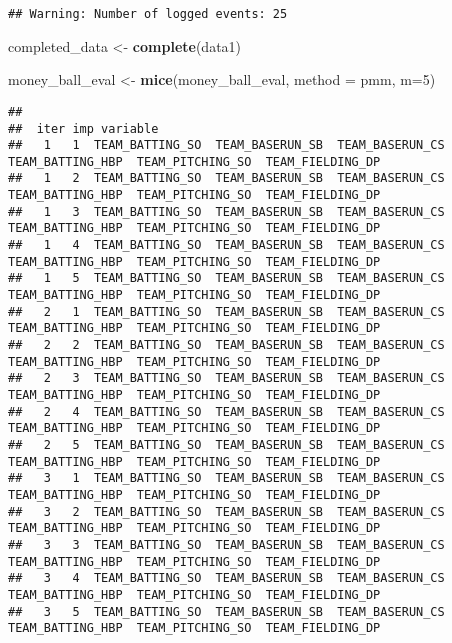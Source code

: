 \documentclass[
]{article}
\newenvironment{Shaded}{\begin{snugshade}}{\end{snugshade}}
\newcommand{\AttributeTok}[1]{\textcolor[rgb]{0.13,0.29,0.53}{#1}}
\newcommand{\DecValTok}[1]{\textcolor[rgb]{0.00,0.00,0.81}{#1}}
\newcommand{\FunctionTok}[1]{\textcolor[rgb]{0.13,0.29,0.53}{\textbf{#1}}}
\newcommand{\NormalTok}[1]{#1}
\newcommand{\OtherTok}[1]{\textcolor[rgb]{0.56,0.35,0.01}{#1}}
\newcommand{\StringTok}[1]{\textcolor[rgb]{0.31,0.60,0.02}{#1}}
\begin{document}
\begin{verbatim}
## Warning: Number of logged events: 25
\end{verbatim}

\begin{Shaded}
\begin{Highlighting}[]
\NormalTok{completed\_data }\OtherTok{\textless{}{-}} \FunctionTok{complete}\NormalTok{(data1)}

\NormalTok{money\_ball\_eval }\OtherTok{\textless{}{-}} \FunctionTok{mice}\NormalTok{(money\_ball\_eval, }\AttributeTok{method =} \StringTok{\textquotesingle{}pmm\textquotesingle{}}\NormalTok{, }\AttributeTok{m=}\DecValTok{5}\NormalTok{)}
\end{Highlighting}
\end{Shaded}

\begin{verbatim}
## 
##  iter imp variable
##   1   1  TEAM_BATTING_SO  TEAM_BASERUN_SB  TEAM_BASERUN_CS  TEAM_BATTING_HBP  TEAM_PITCHING_SO  TEAM_FIELDING_DP
##   1   2  TEAM_BATTING_SO  TEAM_BASERUN_SB  TEAM_BASERUN_CS  TEAM_BATTING_HBP  TEAM_PITCHING_SO  TEAM_FIELDING_DP
##   1   3  TEAM_BATTING_SO  TEAM_BASERUN_SB  TEAM_BASERUN_CS  TEAM_BATTING_HBP  TEAM_PITCHING_SO  TEAM_FIELDING_DP
##   1   4  TEAM_BATTING_SO  TEAM_BASERUN_SB  TEAM_BASERUN_CS  TEAM_BATTING_HBP  TEAM_PITCHING_SO  TEAM_FIELDING_DP
##   1   5  TEAM_BATTING_SO  TEAM_BASERUN_SB  TEAM_BASERUN_CS  TEAM_BATTING_HBP  TEAM_PITCHING_SO  TEAM_FIELDING_DP
##   2   1  TEAM_BATTING_SO  TEAM_BASERUN_SB  TEAM_BASERUN_CS  TEAM_BATTING_HBP  TEAM_PITCHING_SO  TEAM_FIELDING_DP
##   2   2  TEAM_BATTING_SO  TEAM_BASERUN_SB  TEAM_BASERUN_CS  TEAM_BATTING_HBP  TEAM_PITCHING_SO  TEAM_FIELDING_DP
##   2   3  TEAM_BATTING_SO  TEAM_BASERUN_SB  TEAM_BASERUN_CS  TEAM_BATTING_HBP  TEAM_PITCHING_SO  TEAM_FIELDING_DP
##   2   4  TEAM_BATTING_SO  TEAM_BASERUN_SB  TEAM_BASERUN_CS  TEAM_BATTING_HBP  TEAM_PITCHING_SO  TEAM_FIELDING_DP
##   2   5  TEAM_BATTING_SO  TEAM_BASERUN_SB  TEAM_BASERUN_CS  TEAM_BATTING_HBP  TEAM_PITCHING_SO  TEAM_FIELDING_DP
##   3   1  TEAM_BATTING_SO  TEAM_BASERUN_SB  TEAM_BASERUN_CS  TEAM_BATTING_HBP  TEAM_PITCHING_SO  TEAM_FIELDING_DP
##   3   2  TEAM_BATTING_SO  TEAM_BASERUN_SB  TEAM_BASERUN_CS  TEAM_BATTING_HBP  TEAM_PITCHING_SO  TEAM_FIELDING_DP
##   3   3  TEAM_BATTING_SO  TEAM_BASERUN_SB  TEAM_BASERUN_CS  TEAM_BATTING_HBP  TEAM_PITCHING_SO  TEAM_FIELDING_DP
##   3   4  TEAM_BATTING_SO  TEAM_BASERUN_SB  TEAM_BASERUN_CS  TEAM_BATTING_HBP  TEAM_PITCHING_SO  TEAM_FIELDING_DP
##   3   5  TEAM_BATTING_SO  TEAM_BASERUN_SB  TEAM_BASERUN_CS  TEAM_BATTING_HBP  TEAM_PITCHING_SO  TEAM_FIELDING_DP

\end{verbatim}
\end{document}
